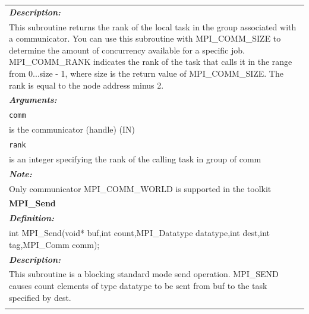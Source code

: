 \begin{longtable}{|p{5.5in}|}
\emph{\bfseries{Description: }} \\
This subroutine returns the rank of the local task in the group associated with a communicator. You can use this subroutine with MPI\_COMM\_SIZE to determine the amount of concurrency available for a specific job. MPI\_COMM\_RANK indicates the rank of the task that calls it in the range from 0...size - 1, where size is the return value of MPI\_COMM\_SIZE. The rank is equal to the node address minus 2. \\
\vspace{-0.3cm}

\emph{\bfseries{Arguments: }} \\
\lstinline$comm$\\
\hspace{0.5cm}     is the communicator (handle) (IN)\\
\lstinline$rank$\\
\hspace{0.5cm}     is an integer specifying the rank of the calling task in group of comm \\
\vspace{-0.3cm}

\emph{\bfseries{Note: }} \\
Only communicator MPI\_COMM\_WORLD is supported in the toolkit\\

\hline

\vspace{-0.8cm}

\LARGE{\bfseries{MPI\_Send}} \\

\vspace{-0.3cm}

\emph{\bfseries{Definition: }} \\
int MPI\_Send(void* buf,int count,MPI\_Datatype datatype,int dest,int tag,MPI\_Comm comm); \\
\vspace{-0.3cm}

\emph{\bfseries{Description: }} \\
This subroutine is a blocking standard mode send operation. MPI\_SEND causes count elements of type datatype to be sent from buf to the task specified by dest. \\
\vspace{-0.3cm}


\end{longtable}
